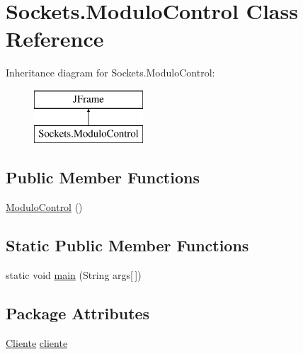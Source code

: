 \hypertarget{class_sockets_1_1_modulo_control}{}\section{Sockets.\+Modulo\+Control Class Reference}
\label{class_sockets_1_1_modulo_control}
Inheritance diagram for Sockets.\+Modulo\+Control\+:\begin{figure}[H]
\begin{center}
\leavevmode
\includegraphics[height=2.000000cm]{class_sockets_1_1_modulo_control}
\end{center}
\end{figure}
\subsection*{Public Member Functions}
\begin{DoxyCompactItemize}
\item 
\mbox{\hyperlink{class_sockets_1_1_modulo_control_a45556bb63f8210bc421e40d207a52ea9}{Modulo\+Control}} ()
\end{DoxyCompactItemize}
\subsection*{Static Public Member Functions}
\begin{DoxyCompactItemize}
\item 
static void \mbox{\hyperlink{class_sockets_1_1_modulo_control_ab4bba6507dcec16d872735788687efdf}{main}} (String args\mbox{[}$\,$\mbox{]})
\end{DoxyCompactItemize}
\subsection*{Package Attributes}
\begin{DoxyCompactItemize}
\item 
\mbox{\hyperlink{class_sockets_1_1_cliente}{Cliente}} \mbox{\hyperlink{class_sockets_1_1_modulo_control_ae24879f5b211f987267a002a09329415}{cliente}}
\end{DoxyCompactItemize}

